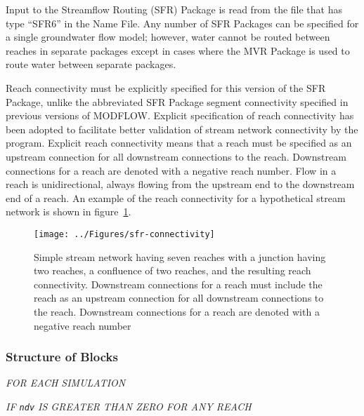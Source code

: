 Input to the Streamflow Routing (SFR) Package is read from the file that has type ``SFR6'' in the Name File. Any number of SFR Packages can be specified for a single groundwater flow model; however, water cannot be routed between reaches in separate packages except in cases where the MVR Package is used to route water between separate packages.

Reach connectivity must be explicitly specified for this version of the SFR Package, unlike the abbreviated SFR Package segment connectivity specified in previous versions of MODFLOW. Explicit specification of reach connectivity has been adopted to facilitate better validation of stream network connectivity by the program. Explicit reach connectivity means that a reach must be specified as an upstream connection for all downstream connections to the reach. Downstream connections for a reach are denoted with a negative reach number. Flow in a reach is unidirectional, always flowing from the upstream end to the downstream end of a reach. An example of the reach connectivity for a hypothetical stream network is shown in figure~\ref{fig:sfr-connectivity}.

\begin{figure}[ht]
	\centering
	\texttt{[image: ../Figures/sfr-connectivity]}
	\caption[Illustration of a simple stream network having seven reaches with a junction having two reaches, a confluence of two reaches, and the resulting reach connectivity]{Simple stream network having seven reaches with a junction having two reaches, a confluence of two reaches, and the resulting reach connectivity. Downstream connections for a reach must include the reach as an upstream connection for all downstream connections to the reach. Downstream connections for a  reach are denoted with a negative reach number}
	\label{fig:sfr-connectivity}
\end{figure}


\vspace{5mm}
\subsubsection{Structure of Blocks}
\vspace{5mm}

\noindent \textit{FOR EACH SIMULATION}




\noindent \textit{IF \texttt{ndv} IS GREATER THAN ZERO FOR ANY REACH}



